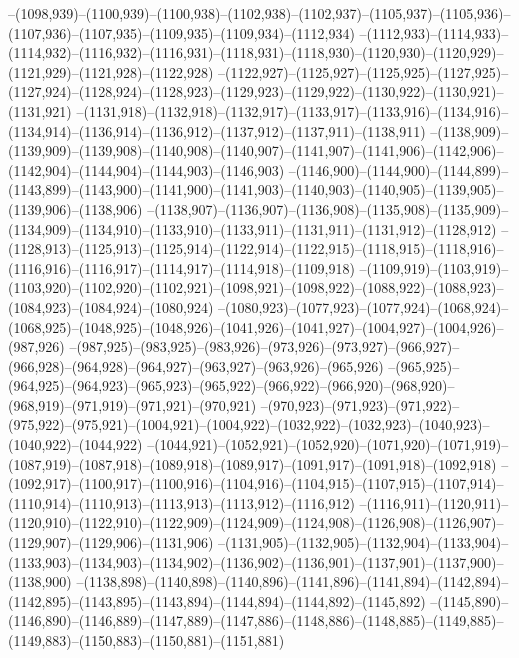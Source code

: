 --(1098,939)--(1100,939)--(1100,938)--(1102,938)--(1102,937)--(1105,937)--(1105,936)--(1107,936)--(1107,935)--(1109,935)--(1109,934)--(1112,934)
--(1112,933)--(1114,933)--(1114,932)--(1116,932)--(1116,931)--(1118,931)--(1118,930)--(1120,930)--(1120,929)--(1121,929)--(1121,928)--(1122,928)
--(1122,927)--(1125,927)--(1125,925)--(1127,925)--(1127,924)--(1128,924)--(1128,923)--(1129,923)--(1129,922)--(1130,922)--(1130,921)--(1131,921)
--(1131,918)--(1132,918)--(1132,917)--(1133,917)--(1133,916)--(1134,916)--(1134,914)--(1136,914)--(1136,912)--(1137,912)--(1137,911)--(1138,911)
--(1138,909)--(1139,909)--(1139,908)--(1140,908)--(1140,907)--(1141,907)--(1141,906)--(1142,906)--(1142,904)--(1144,904)--(1144,903)--(1146,903)
--(1146,900)--(1144,900)--(1144,899)--(1143,899)--(1143,900)--(1141,900)--(1141,903)--(1140,903)--(1140,905)--(1139,905)--(1139,906)--(1138,906)
--(1138,907)--(1136,907)--(1136,908)--(1135,908)--(1135,909)--(1134,909)--(1134,910)--(1133,910)--(1133,911)--(1131,911)--(1131,912)--(1128,912)
--(1128,913)--(1125,913)--(1125,914)--(1122,914)--(1122,915)--(1118,915)--(1118,916)--(1116,916)--(1116,917)--(1114,917)--(1114,918)--(1109,918)
--(1109,919)--(1103,919)--(1103,920)--(1102,920)--(1102,921)--(1098,921)--(1098,922)--(1088,922)--(1088,923)--(1084,923)--(1084,924)--(1080,924)
--(1080,923)--(1077,923)--(1077,924)--(1068,924)--(1068,925)--(1048,925)--(1048,926)--(1041,926)--(1041,927)--(1004,927)--(1004,926)--(987,926)
--(987,925)--(983,925)--(983,926)--(973,926)--(973,927)--(966,927)--(966,928)--(964,928)--(964,927)--(963,927)--(963,926)--(965,926)
--(965,925)--(964,925)--(964,923)--(965,923)--(965,922)--(966,922)--(966,920)--(968,920)--(968,919)--(971,919)--(971,921)--(970,921)
--(970,923)--(971,923)--(971,922)--(975,922)--(975,921)--(1004,921)--(1004,922)--(1032,922)--(1032,923)--(1040,923)--(1040,922)--(1044,922)
--(1044,921)--(1052,921)--(1052,920)--(1071,920)--(1071,919)--(1087,919)--(1087,918)--(1089,918)--(1089,917)--(1091,917)--(1091,918)--(1092,918)
--(1092,917)--(1100,917)--(1100,916)--(1104,916)--(1104,915)--(1107,915)--(1107,914)--(1110,914)--(1110,913)--(1113,913)--(1113,912)--(1116,912)
--(1116,911)--(1120,911)--(1120,910)--(1122,910)--(1122,909)--(1124,909)--(1124,908)--(1126,908)--(1126,907)--(1129,907)--(1129,906)--(1131,906)
--(1131,905)--(1132,905)--(1132,904)--(1133,904)--(1133,903)--(1134,903)--(1134,902)--(1136,902)--(1136,901)--(1137,901)--(1137,900)--(1138,900)
--(1138,898)--(1140,898)--(1140,896)--(1141,896)--(1141,894)--(1142,894)--(1142,895)--(1143,895)--(1143,894)--(1144,894)--(1144,892)--(1145,892)
--(1145,890)--(1146,890)--(1146,889)--(1147,889)--(1147,886)--(1148,886)--(1148,885)--(1149,885)--(1149,883)--(1150,883)--(1150,881)--(1151,881)
